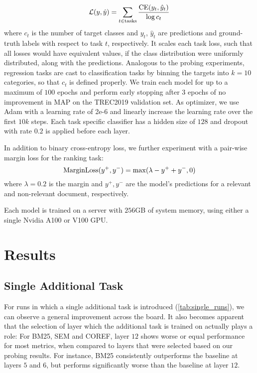 \begin{equation}
    \mathcal{L}(y, \hat{y}) = \sum_{t \in \text{tasks}} \frac{\textnormal{CE}(y_t, \hat{y}_t)}{\log c_t}
\end{equation}
where $c_t$ is the number of target classes and $y_t$, $\hat{y}_t$ are predictions and ground-truth labels with respect to task $t$, respectively. It scales each task loss, such that all losses would have equivalent values, if the class distribution were uniformly distributed, along with the predictions. Analogous to the probing experiments, regression tasks are cast to classification tasks by binning the targets into $k=10$ categories, so that $c_t$ is defined properly.
We train each model for up to a maximum of $100$ epochs and perform early stopping after $3$ epochs of no improvement in MAP on the TREC2019 validation set. As optimizer, we use Adam \cite{kingma2014adam} with a learning rate of 2e-6 and linearly increase the learning rate over the first $10k$ steps. Each task specific classifier has a hidden size of $128$ and dropout with rate $0.2$ is applied before each layer.

In addition to binary cross-entropy loss, we further experiment with a pair-wise margin loss for the ranking task:
\begin{equation}
    \text{MarginLoss}(y^+, y^-) = \max(\lambda - y^+ + y^-, 0)
\end{equation}
where $\lambda=0.2$ is the margin and $y^+, y^-$ are the model's predictions for a relevant and non-relevant document, respectively.

Each model is trained on a server with $256$GB of system memory, using either a single Nvidia A100 or V100 GPU.


\section{Results}
\label{sec:mtl_results}
\subsection{Single Additional Task}
For runs in which a single additional task is introduced (\autoref{tab:single_runs}), we can observe a general improvement across the board. It also becomes apparent that the selection of layer which the additional task is trained on actually plays a role: For BM25, SEM and COREF, layer $12$ shows worse or equal performance for most metrics, when compared to layers that were selected based on our probing results. For instance, BM25 consistently outperforms the baseline at layers $5$ and $6$, but performs significantly worse than the baseline at layer $12$.

